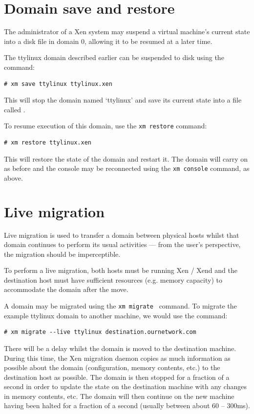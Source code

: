 \documentclass[11pt,twoside,final,openright]{xenstyle}
\begin{document}
\section{Domain save and restore}

The administrator of a Xen system may suspend a virtual machine's
current state into a disk file in domain 0, allowing it to be resumed
at a later time.

The ttylinux domain described earlier can be suspended to disk using
the command:
\begin{verbatim}
# xm save ttylinux ttylinux.xen
\end{verbatim}

This will stop the domain named `ttylinux' and save its current state
into a file called .

To resume execution of this domain, use the {\tt xm restore} command:
\begin{verbatim}
# xm restore ttylinux.xen
\end{verbatim}

This will restore the state of the domain and restart it.  The domain
will carry on as before and the console may be reconnected using the
{\tt xm console} command, as above.

\section{Live migration}

Live migration is used to transfer a domain between physical hosts
whilst that domain continues to perform its usual activities --- from
the user's perspective, the migration should be imperceptible.

To perform a live migration, both hosts must be running Xen / Xend and
the destination host must have sufficient resources (e.g. memory
capacity) to accommodate the domain after the move.

A domain may be migrated using the {\tt xm migrate } command.  To
migrate the example ttylinux domain to another machine, we would use
the command:

\begin{verbatim}
# xm migrate --live ttylinux destination.ournetwork.com
\end{verbatim}

There will be a delay whilst the domain is moved to the destination
machine.  During this time, the Xen migration daemon copies as much
information as possible about the domain (configuration, memory
contents, etc.) to the destination host as possible.  The domain is
then stopped for a fraction of a second in order to update the state
on the destination machine with any changes in memory contents, etc.
The domain will then continue on the new machine having been halted
for a fraction of a second (usually between about 60 -- 300ms).
\end{document}
